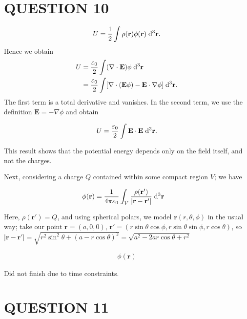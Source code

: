 \documentclass[a4paper]{article}
\begin{document}
\section{QUESTION 10}

\[
U = \frac{1}{2} \int \rho (\mathbf{r}) \phi(\mathbf{r}) \;\mathrm{d}^3 \mathbf{r}.
\]
Hence we obtain
\begin{align*}
U &= \frac{\varepsilon_0}{2}\int (\nabla\cdot \mathbf{E}) \phi \;\mathrm{d}^3 \mathbf{r}\\
&= \frac{\varepsilon_0}{2}\int [\nabla\cdot (\mathbf{E}\phi) - \mathbf{E}\cdot \nabla \phi]\;\mathrm{d}^3 \mathbf{r}.
\end{align*}
The first term is a total derivative and vanishes. In the second term, we use the definition $\mathbf{E} = -\nabla \phi$ and obtain


	\[
	U = \frac{\varepsilon_0}{2}\int \mathbf{E}\cdot \mathbf{E} \;\mathrm{d}^3 \mathbf{r}.
	\]


This result shows that the potential energy depends only on the field itself, and not the charges. 


Next, considering a charge $ Q $ contained within some compact region $ V $; we have

\begin{align*}
\phi(\mathbf{r}) & = \frac{1}{4 \pi \varepsilon_{0}} \int_{V} \frac{\rho(\mathbf{r}')}{| \mathbf{r} - \mathbf{r}' |} \; \mathrm{d}^{3} \mathbf{r}
\end{align*}

Here, $ \rho(\mathbf{r}') = Q $, and using spherical polars, we model $ \mathbf{r}(r,\theta,\phi) $ in the usual way; take our point $ \mathbf{r} = (a,0,0) $, $ \mathbf{r}' = (r \sin \theta \cos \phi, r \sin \theta \sin \phi, r \cos \theta )  $, so $ | \mathbf{r} - \mathbf{r}' | = \sqrt{r^{2} \sin^{2} \theta + (a - r \cos \theta)^{2}} = \sqrt{a^{2} - 2 a r \cos \theta + r^{2}}  $


\begin{align*}
\phi(\mathbf{r}) 
\end{align*}

Did not finish due to time constraints.



\section{QUESTION 11}
\end{document}

